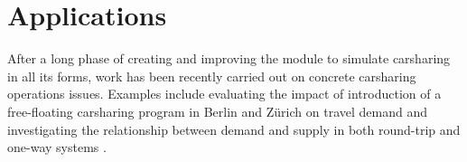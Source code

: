 \section{Applications}
After a long phase of creating and improving the module to simulate carsharing in all its forms, work has been recently carried out on concrete carsharing operations issues. Examples include evaluating the impact of introduction of a free-floating carsharing program in Berlin \citep[][]{CiariEtAl_TRR_2014} and Zürich \citep[][]{CiariEtAl_Transportation_2014} on travel demand and investigating the relationship between demand and supply in both round-trip and one-way systems \citep[][]{BalacEtAl_TRB_2015}.




